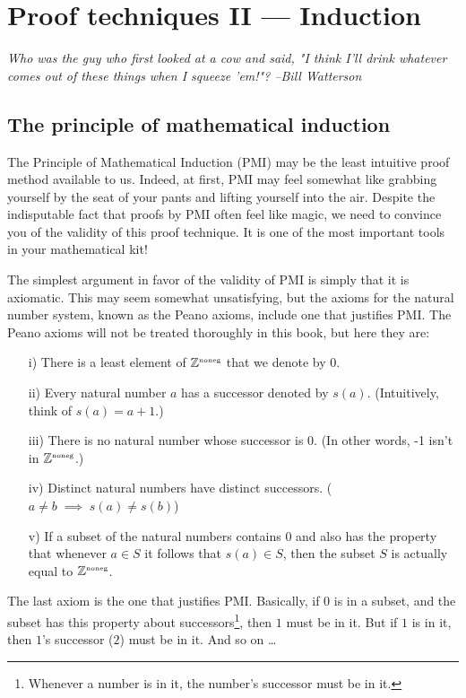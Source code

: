 
\chapter{Proof techniques II --- Induction}

{\em Who was the guy who first looked at a cow and said, "I think I'll drink whatever comes out of these things when I squeeze 'em!"? --Bill Watterson}

\section{The principle of mathematical induction}
\label{sec:induct}

The Principle of Mathematical Induction (PMI) may be the least intuitive
proof method available to us.  Indeed, at first, PMI may feel somewhat like
grabbing yourself by the seat of your pants and lifting yourself into
the air.  Despite the indisputable fact that proofs by PMI often feel
like magic, we need to convince you of the validity of this proof
technique.  It is one of the most important tools in your mathematical
kit!

The simplest argument in favor of the validity of PMI is simply that it is
axiomatic.  This may seem somewhat unsatisfying, but the axioms for
the natural number system, known as the Peano axioms,
include one that justifies PMI.  The Peano axioms will not be treated 
thoroughly in this book, but here they are:

\begin{enumerate}
\item[i)] There is a least element of ${\mathbb Z}^{\mbox{\tiny noneg}}$ that we denote by $0$.
\item[ii)] Every natural number $a$ has a successor denoted by $s(a)$.
(Intuitively, think of $s(a) = a+1$.)
\item[iii)] There is no natural number whose successor is $0$.  (In other
words, -1 isn't in ${\mathbb Z}^{\mbox{\tiny noneg}}$.)
\item[iv)] Distinct natural numbers have distinct successors.  
($a \neq b \; \implies \; s(a) \neq s(b)$) 
\item[v)] If a subset of the natural numbers contains $0$ and also has the
property that whenever $a \in S$ it follows that $s(a) \in S$, then the
subset $S$ is actually equal to ${\mathbb Z}^{\mbox{\tiny noneg}}$.   
\end{enumerate}

The last axiom is the one that justifies PMI.  Basically, if $0$ is in
a subset, and the subset has this property about successors\footnote{Whenever a number is in it, the number's successor must be in it.}, then $1$ must
be in it.  But if $1$ is in it, then $1$'s successor ($2$) must be in it.
And so on \ldots  

